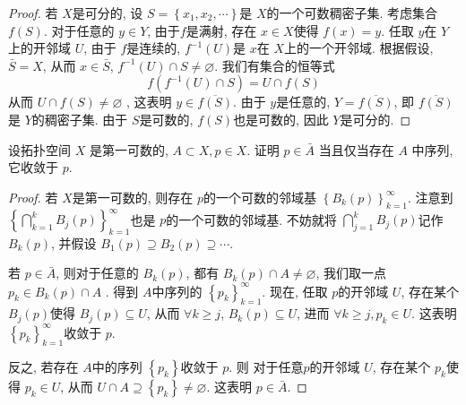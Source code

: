 \documentclass[../main.tex]{subfiles}
\begin{document}
\begin{proof}
    若 \(  X  \)是可分的, 设 \(  S= \left\{ x_1,x_2 ,\cdots \right\}  \)是 \(  X  \)的一个可数稠密子集. 考虑集合 \(  f\left( S \right)   \). 对于任意的 \(  y \in Y  \), 由于\(  f  \)是满射, 存在 \(  x \in X  \)使得 \(  f\left( x \right)= y   \). 任取 \(  y  \)在 \(  Y  \)上的开邻域 \(  U  \), 由于 \(  f  \)是连续的,  \(  f^{-1} \left( U \right)   \)是 \(  x  \)在 \(  X  \)上的一个开邻域. 根据假设, \(  \bar{S}= X  \), 从而 \(  x \in \bar{S}  \), \(  f^{-1} \left( U \right)\cap S\neq \varnothing   \).                 我们有集合的恒等式 \[
    f\left( f^{-1} \left( U \right)\cap S  \right)= U\cap f\left( S \right)  
    \]从而 \(  U\cap f\left( S \right)\neq \varnothing   \) , 这表明 \(  y \in  \overline{f\left( S \right) }  \). 由于 \(  y  \)是任意的,  \(  Y=  \overline{f\left( S \right) }  \), 即 \(  \overline{f\left( S \right) }  \)是 \(  Y  \)的稠密子集. 由于 \(  S  \)是可数的,  \(  f\left( S \right)   \)也是可数的, 因此 \(  Y  \)是可分的.        
\end{proof}


\begin{exercise}{}{}
设拓扑空间 $X$ 是第一可数的, $A \subset X, p \in X$. 证明 $p \in \bar{A}$ 当且仅当存在 $A$ 中序列, 它收敛于 $p$.
\end{exercise}
\begin{proof}
    若 \(  X  \)是第一可数的, 则存在 \(  p  \)的一个可数的邻域基 \(  \left\{ B_{k}\left( p \right)  \right\}_{k= 1}^{\infty}  \). 注意到 \(  \left\{ \bigcap _{k= 1}^{k}B_{j}\left( p \right)  \right\}_{k= 1}^{\infty}  \)也是 \(  p  \)的一个可数的邻域基. 不妨就将 \(  \bigcap _{j= 1}^{k}B_{j}\left( p \right)   \)记作 \(  B_{k}\left( p \right)   \), 并假设 \(  B_1\left( p \right)\supseteq B_2\left( p \right)\supseteq \cdots     \). 

    若 \(  p \in \bar{A}  \), 则对于任意的 \(  B_{k}\left( p \right)   \), 都有 \(  B_{k}\left( p \right)\cap A\neq \varnothing   \), 我们取一点 \(  p_{k}\in B_{k}\left( p \right)\cap A   \)    . 得到 \(  A  \)中序列的 \(  \left\{ p_{k} \right\}_{k= 1}^{\infty}  \).       现在, 任取 \(  p  \)的开邻域 \(  U  \), 存在某个 \(  B_{j}\left( p \right)   \)使得 \(  B_{j}\left( p \right)\subseteq U   \), 从而 \(  \forall k\ge j  \), \(  B_{k}\left( p \right)\subseteq U   \), 进而 \(  \forall k\ge j  ,p_{k}\in U\).    这表明 \(  \left\{ p_{k} \right\}_{k= 1}^{\infty}  \)收敛于 \(  p  \).  


    反之, 若存在 \(  A  \)中的序列 \(  \left\{ p_{k} \right\}  \)收敛于 \(  p  \). 则 对于任意\(  p  \)的开邻域 \(  U  \), 存在某个 \(  p_{k}  \)使得 \(  p_{k}\in U  \), 从而 \(  U\cap A\supseteq \left\{ p_{k} \right\}\neq \varnothing  \).   这表明 \(  p \in \bar{A}  \).       
\end{proof}
\end{document}
